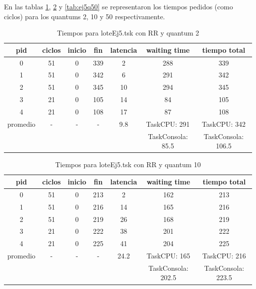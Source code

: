 En las tablas \ref{tab:ej5q2},  \ref{tab:ej5q10} y \ref{tab:ej5q50} se representaron los tiempos pedidos (como ciclos) para los quantums 2, 10 y 50 respectivamente.
\begin{table}[H]
\centering
\begin{tabular}{ | c | c | c | c | c | c | c | }
  \hline			
  pid & ciclos & inicio & fin & latencia & waiting time & tiempo total  \\
  \hline
 0 & 51 & 0 & 339 & 2 & 288 & 339\\
1 & 51 & 0 & 342 & 6 & 291 & 342\\
2 & 51 & 0 & 345 & 10 & 294 & 345\\
3 & 21 & 0 & 105 & 14 & 84 & 105\\
4 & 21 & 0 & 108 & 17 & 87 & 108\\
  \hline
promedio & - & - & - & 9.8 & TaskCPU: 291  & TaskCPU: 342 \\
                & &  &  &  & TaskConsola: 85.5  & TaskConsola: 106.5\\
  \hline
\end{tabular}
\caption{Tiempos para loteEj5.tsk con RR y quantum 2}\label{tab:ej5q2}
\end{table}

\begin{table}[H]
\centering
\begin{tabular}{ | c | c | c | c | c | c | c | }
  \hline			
  pid & ciclos & inicio & fin & latencia & waiting time & tiempo total  \\
  \hline
0 & 51 & 0 & 213 & 2 & 162 & 213\\
1 & 51 & 0 & 216 & 14 & 165 & 216\\
2 & 51 & 0 & 219 & 26 & 168 & 219\\
3 & 21 & 0 & 222 & 38 & 201 & 222\\
4 & 21 & 0 & 225 & 41 & 204 & 225\\
  \hline
promedio & - & - & - & 24.2 & TaskCPU: 165  & TaskCPU: 216\\
                & &  &  &  & TaskConsola: 202.5  & TaskConsola: 223.5\\
\hline
\end{tabular}
\caption{Tiempos para loteEj5.tsk con RR y quantum 10}\label{tab:ej5q10}
\end{table}

